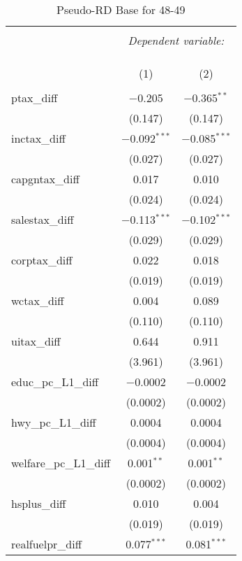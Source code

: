 
\begin{table}[!htbp] \centering 
  \caption{Pseudo-RD Base for  48-49} 
  \label{} 
\begin{tabular}{@{\extracolsep{5pt}}lcc} 
\\[-1.8ex]\hline 
\hline \\[-1.8ex] 
 & \multicolumn{2}{c}{\textit{Dependent variable:}} \\ 
\cline{2-3} 
\\[-1.8ex] & \multicolumn{2}{c}{ } \\ 
\\[-1.8ex] & (1) & (2)\\ 
\hline \\[-1.8ex] 
 ptax\_diff & $-$0.205 & $-$0.365$^{**}$ \\ 
  & (0.147) & (0.147) \\ 
  inctax\_diff & $-$0.092$^{***}$ & $-$0.085$^{***}$ \\ 
  & (0.027) & (0.027) \\ 
  capgntax\_diff & 0.017 & 0.010 \\ 
  & (0.024) & (0.024) \\ 
  salestax\_diff & $-$0.113$^{***}$ & $-$0.102$^{***}$ \\ 
  & (0.029) & (0.029) \\ 
  corptax\_diff & 0.022 & 0.018 \\ 
  & (0.019) & (0.019) \\ 
  wctax\_diff & 0.004 & 0.089 \\ 
  & (0.110) & (0.110) \\ 
  uitax\_diff & 0.644 & 0.911 \\ 
  & (3.961) & (3.961) \\ 
  educ\_pc\_L1\_diff & $-$0.0002 & $-$0.0002 \\ 
  & (0.0002) & (0.0002) \\ 
  hwy\_pc\_L1\_diff & 0.0004 & 0.0004 \\ 
  & (0.0004) & (0.0004) \\ 
  welfare\_pc\_L1\_diff & 0.001$^{**}$ & 0.001$^{**}$ \\ 
  & (0.0002) & (0.0002) \\ 
  hsplus\_diff & 0.010 & 0.004 \\ 
  & (0.019) & (0.019) \\ 
  realfuelpr\_diff & 0.077$^{***}$ & 0.081$^{***}$ \\ 

\end{tabular}
\end{table}
